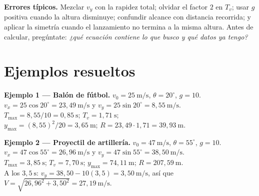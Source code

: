 \documentclass[12pt, letterpaper]{article}
\providecommand{\sen}{\sin}
\begin{document}
\begin{cuadroadvertencia}
  \small
  \textbf{Errores típicos.} Mezclar $v_y$ con la rapidez total; olvidar el
  factor $2$ en $T_v$; usar $g$ positiva cuando la altura disminuye; confundir
  alcance con distancia recorrida; y aplicar la simetría cuando el lanzamiento
  no termina a la misma altura. Antes de calcular, pregúntate:
  \emph{¿qué ecuación contiene lo que busco y qué datos ya tengo?}
\end{cuadroadvertencia}

\section{Ejemplos resueltos}

\begin{cuadrosolucion}
  \small
  \textbf{Ejemplo 1 — Balón de fútbol.} $v_0=25\ \text{m/s}$,
  $\theta=20^\circ$, $g=10$.\\[2pt]
  $v_x=25\cos20^\circ=23{,}49\ \text{m/s}$ y
  $v_y=25\sen20^\circ=8{,}55\ \text{m/s}$.\\
  $T_{\max}=8{,}55/10=0{,}85\ \text{s}$;
  $T_v=1{,}71\ \text{s}$;\\
  $y_{\max}=(8{,}55)^2/20=3{,}65\ \text{m}$;
  $R=23{,}49\cdot1{,}71=39{,}93\ \text{m}$.
\end{cuadrosolucion}

\begin{cuadrosolucion}
  \small
  \textbf{Ejemplo 2 — Proyectil de artillería.} $v_0=47\ \text{m/s}$,
  $\theta=55^\circ$, $g=10$.\\[2pt]
  $v_x=47\cos55^\circ=26{,}96\ \text{m/s}$ y
  $v_y=47\sen55^\circ=38{,}50\ \text{m/s}$.\\
  $T_{\max}=3{,}85\ \text{s}$; $T_v=7{,}70\ \text{s}$;
  $y_{\max}=74{,}11\ \text{m}$; $R=207{,}59\ \text{m}$.\\
  A los $3{,}5\ \text{s}$: $v_y=38{,}50-10(3{,}5)=3{,}50\ \text{m/s}$, así que
  $V=\sqrt{26{,}96^2+3{,}50^2}=27{,}19\ \text{m/s}$.
\end{cuadrosolucion}
\end{document}
